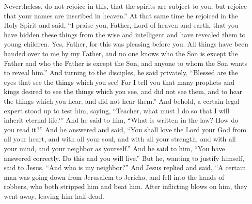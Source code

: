 \begin{biblechapter}
\verse Nevertheless, do not rejoice in this, that the spirits are subject to you, but rejoice that your names are inscribed in heaven.”
 At that same time he rejoiced in the Holy Spirit and said, “I praise you, Father, Lord of heaven and earth, that you have hidden these things from the wise and intelligent and have revealed them to young children. Yes, Father, for this was pleasing before you.
\verse All things have been handed over to me by my Father, and no one knows who the Son is except the Father and who the Father is except the Son, and anyone to whom the Son wants to reveal him.”
\verse And turning to the disciples, he said privately, “Blessed are the eyes that see the things which you see!
\verse For I tell you that many prophets and kings desired to see the things which you see, and did not see them, and to hear the things which you hear, and did not hear them.”
 And behold, a certain legal expert stood up to test him, saying, “Teacher, what must I do so that I will inherit eternal life?”
\verse And he said to him, “What is written in the law? How do you read it?”
\verse And he answered and said, “You shall love the Lord your God from all your heart, and with all your soul, and with all your strength, and with all your mind, and your neighbor as yourself.”
\verse And he said to him, “You have answered correctly. Do this and you will live.”
\verse But he, wanting to justify himself, said to Jesus, “And who is my neighbor?”
\verse And Jesus replied and said, “A certain man was going down from Jerusalem to Jericho, and fell into the hands of robbers, who both stripped him and beat him. After inflicting blows on him, they went away, leaving him half dead.

\end{biblechapter}
